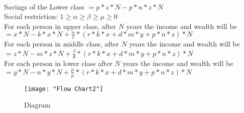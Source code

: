 \documentclass[12pt,a4paper]{article}
\begin{document}
   \\Savings of the Lower class  $=p{\ast}z{\ast}N -p{\ast}n{\ast}z{\ast}N$
   \medskip
   \\Social restriction: $1\geqslant\alpha\geqslant\beta\geqslant\mu\geqslant0$
   \medskip
   \\For each person in upper class, after $N$ years the income and wealth will be
   $= x{\ast}N-k{\ast}x{\ast}N + \frac{\alpha}{r}{\ast}(r{\ast}k{\ast}x + d{\ast}m{\ast}y + p{\ast}n{\ast}z){\ast}N$
   \medskip 
   \\For each person in middle class, after $N$ years the income and wealth will be
   \medskip
   $= z{\ast}N-m{\ast}z{\ast}N + \frac{\beta}{d}{\ast}(r{\ast}k{\ast}x + d{\ast}m{\ast}y + p{\ast}n{\ast}z){\ast}N$
  \\For each person in lower class after $N$ years the income and wealth will be
  $= y{\ast}N-n{\ast}y{\ast}N + \frac{\mu}{p}{\ast}(r{\ast}k{\ast}x + d{\ast}m{\ast}y + p{\ast}n{\ast}z){\ast}N$ 
    \begin{figure}
    	\centering
    	\texttt{[image: "Flow Chart2"]}
    	\caption{Diagram}
    	\label{fig:flow-chart2}
    \end{figure} 
\newpage
  
\end{document}

